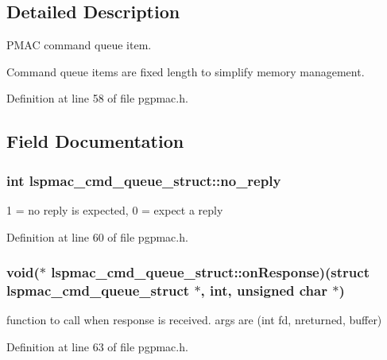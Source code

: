 \subsection{Detailed Description}
P\-M\-A\-C command queue item. 

Command queue items are fixed length to simplify memory management. 

Definition at line 58 of file pgpmac.\-h.



\subsection{Field Documentation}
\hypertarget{structlspmac__cmd__queue__struct_a33f70b45f8b7c27935cd3efe28748479}{
\subsubsection[{no\-\_\-reply}]{\setlength{\rightskip}{0pt plus 5cm}int lspmac\-\_\-cmd\-\_\-queue\-\_\-struct\-::no\-\_\-reply}}\label{structlspmac__cmd__queue__struct_a33f70b45f8b7c27935cd3efe28748479}


1 = no reply is expected, 0 = expect a reply 



Definition at line 60 of file pgpmac.\-h.

\hypertarget{structlspmac__cmd__queue__struct_afe92c0bab9f124314a6f3d8104c94364}{
\subsubsection[{on\-Response}]{\setlength{\rightskip}{0pt plus 5cm}void($\ast$ lspmac\-\_\-cmd\-\_\-queue\-\_\-struct\-::on\-Response)(struct {\bf lspmac\-\_\-cmd\-\_\-queue\-\_\-struct} $\ast$, int, unsigned char $\ast$)}}\label{structlspmac__cmd__queue__struct_afe92c0bab9f124314a6f3d8104c94364}


function to call when response is received. args are (int fd, nreturned, buffer) 



Definition at line 63 of file pgpmac.\-h.

